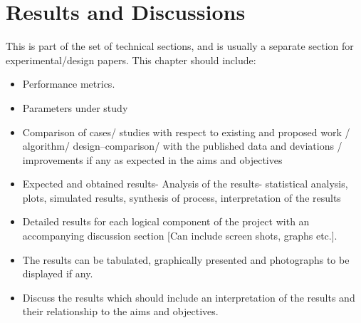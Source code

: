 \chapter{Results and Discussions}
This is part of the set of technical sections, and is usually a separate section for experimental/design papers.  This chapter should include:

\begin{itemize}
	\item Performance metrics.
	\item Parameters under study 
	\item Comparison of cases/ studies with respect to existing and proposed work / algorithm/ design–comparison/ with the published data and deviations / improvements if any as expected in the aims and objectives
	\item Expected and obtained results- Analysis of the results- statistical analysis, plots, simulated results, synthesis of process, interpretation of the results 
	\item Detailed results for each logical component of the project with an accompanying discussion section [Can include screen shots, graphs etc.].
	\item The results can be tabulated, graphically presented and photographs to be displayed if any.
	\item Discuss the results which should include an interpretation of the results and their relationship to the aims and objectives.
\end{itemize}